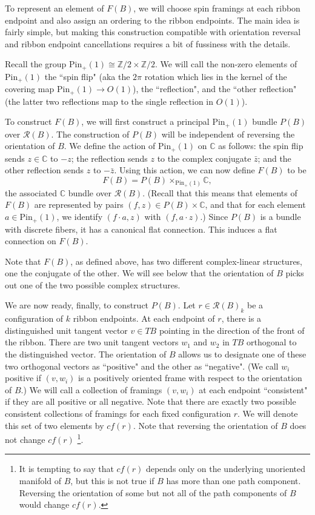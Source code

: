 \documentclass[12pt,a4paper]{article}
\newcommand{\zz}{\mathbb{Z}}
\newcommand{\cc}{\mathbb{C}}
\newcommand{\mcr}{\mathcal{R}}
\newcommand\be            {\begin{equation}}
\newcommand\ee            {\end{equation}}
\newcommand{\spin}{\text{Spin}}
\newcommand{\pin}{\text{Pin}}	%
\begin{document}
\medskip

To represent an element of $F(B)$, we will choose spin framings at each ribbon endpoint and also assign
an ordering to the ribbon endpoints.
The main idea is fairly simple, but making this construction compatible with orientation reversal
and ribbon endpoint cancellations requires a bit of fussiness with the details.

\medskip

Recall the group $\pin_+(1) \cong \zz/2 \times \zz/2$.
We will call the non-zero elements of $\pin_+(1)$ the ``spin flip" (aka the $2\pi$ rotation which lies in the kernel of the covering map
$\pin_+(1) \to O(1)$), the ``reflection", and the ``other reflection"
(the latter two reflections map to the single reflection in $O(1)$).

To construct $F(B)$, we will first construct a principal $\pin_+(1)$ bundle $P(B)$ over $\mcr(B)$.
The construction of $P(B)$ will be independent of reversing the orientation of $B$.
We define the action of $\pin_+(1)$ on $\cc$ as follows:
the spin flip sends $z\in \cc$ to $-z$;
the reflection sends $z$ to the complex conjugate $\bar z$;
and the other reflection sends $z$ to $-\bar z$.
Using this action, we can now define $F(B)$ to be
\be \label{fermbundef}
	F(B) = P(B) \times_{\pin_+(1)} \cc ,
\ee
the associated $\cc$ bundle over $\mcr(B)$.
(Recall that this means that elements of $F(B)$ are represented by pairs $(f, z) \in P(B) \times \cc$,
and that for each element $a \in \pin_+(1)$, we identify $(f\cdot a, z)$ with $(f, a \cdot z)$.)
Since $P(B)$ is a bundle with discrete fibers, it has a canonical flat connection.
This induces a flat connection on $F(B)$.

Note that $F(B)$, as defined above, has two different complex-linear structures, one the conjugate of the other.
We will see below that the orientation of $B$ picks out one of the two possible complex structures.

\medskip

We are now ready, finally, to construct $P(B)$.
Let $r \in \mcr(B)_k$ be a configuration of $k$ ribbon endpoints.
At each endpoint of $r$, there is a distinguished unit tangent vector $v \in TB$
pointing in the direction of the front of the ribbon.
There are two unit tangent vectors $w_1$ and $w_2$ in $TB$ orthogonal to the distinguished vector.
The orientation of $B$ allows us to designate one of these two orthogonal vectors as ``positive"
and the other as ``negative".
(We call $w_i$ positive if $(v, w_i)$ is a positively oriented frame with respect to the orientation of $B$.)
We will call a collection of framings $(v, w_i)$ at each endpoint ``consistent" if they are all positive
or all negative.
Note that there are exactly two possible consistent collections of framings for each fixed configuration $r$.
We will denote this set of two elements by $cf(r)$.
Note that reversing the orientation of $B$ does not change $cf(r)$
\footnote{It is tempting to say that $cf(r)$ depends only on the underlying unoriented manifold of $B$, but this
is not true if $B$ has more than one path component.
Reversing the orientation of some but not all of the path components of $B$ would change $cf(r)$.}.
\end{document}
